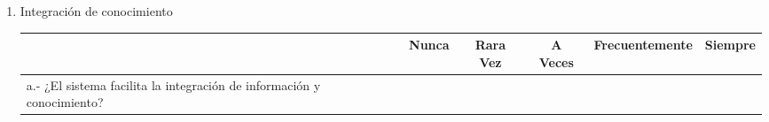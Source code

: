 \begin{enumerate}[1.]
    \item Integración de conocimiento
    
\begin{table}[!h]
\centering
\resizebox{15cm}{!} {
\begin{tabular}{|l|r|l|r|l|l|}
\hline
\multicolumn{1}{|c|}{\textbf{}} & \multicolumn{1}{c|}{\textbf{Nunca}} & \multicolumn{1}{c|}{\textbf{Rara Vez}} & \multicolumn{1}{c|}{\textbf{A Veces}} & \textbf{Frecuentemente} & \multicolumn{1}{c|}{\textbf{Siempre}} \\ \hline
a.- ¿El sistema facilita la integración de información y conocimiento? &  &  &  &  &  \\ \hline
\end{tabular}
}
\end{table}        
\end{enumerate}